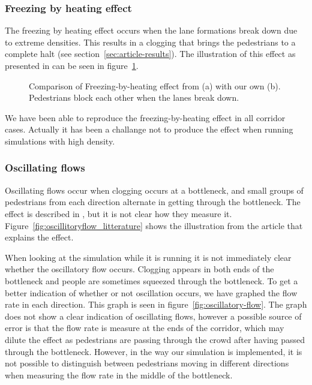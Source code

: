 \subsubsection{Freezing by heating effect}
The freezing by heating effect occurs when the lane formations break 
down due to extreme densities. This results in a clogging that brings 
the pedestrians to a complete halt (see section~\ref{sec:article-results}). 
The illustration of this effect as presented in \cite{oscil} can be seen in 
figure~\ref{fig:freezing_by_heating_litterature}.

\begin{figure}[h]
    \centering
    \caption[Comparison of Freezing-by-heating effect from \cite{oscil} with our own.]{Comparison of Freezing-by-heating effect from \cite{oscil} (a) with our own (b). Pedestrians block each other when the lanes break down.}
    \label{fig:freezing_by_heating_litterature}
\end{figure}

We have been able to reproduce the freezing-by-heating effect in 
all corridor cases. Actually it has been a challange not to produce the 
effect when running simulations with high density.  

\subsubsection{Oscillating flows}
Oscillating flows occur when clogging occurs at a bottleneck, and small groups 
of pedestrians from each direction alternate in getting through the 
bottleneck. The effect is described in \cite{oscil}, but it is not clear how 
they measure it. Figure~\ref{fig:oscillitoryflow_litterature} shows the 
illustration from the article that explains the effect.

When looking at the simulation while it is running it is not immediately clear 
whether the oscillatory flow occurs. Clogging appears in both ends of the 
bottleneck and people are sometimes squeezed through the bottleneck. To get a 
better indication of whether or not oscillation occurs, we have graphed the 
flow rate in each direction. This graph is seen in 
figure~\ref{fig:oscillatory-flow}. The graph does not show a clear indication 
of oscillating flows, however a possible source of error is that the flow rate 
is measure at the ends of the corridor, which may dilute the effect as 
pedestrians are passing through the crowd after having passed through the 
bottleneck. However, in the way our simulation is implemented, it is not 
possible to distinguish between pedestrians moving in different directions 
when measuring the flow rate in the middle of the bottleneck.

